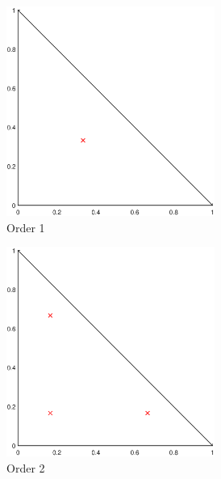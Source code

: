\begin{figure}
\centering
{
	\begin{subfigure}[b]{0.475\textwidth}
		\centering
		\label{subfig::2DInt_RefTri_Q1}
		\includegraphics[width=0.75\textwidth]{figures/sec_BF/RefTriQuad_Q1.eps}
		\caption{Order 1}
	\end{subfigure}
	\hfill
	\begin{subfigure}[b]{0.475\textwidth}
		\centering
		\label{subfig::2DInt_RefTri_Q2}
		\includegraphics[width=0.75\textwidth]{figures/sec_BF/RefTriQuad_Q2.eps}
		\caption{Order 2}
	\end{subfigure}
}
\vspace{3mm}
{
	\begin{subfigure}[b]{0.475\textwidth}

\end{subfigure}}
\end{figure}
